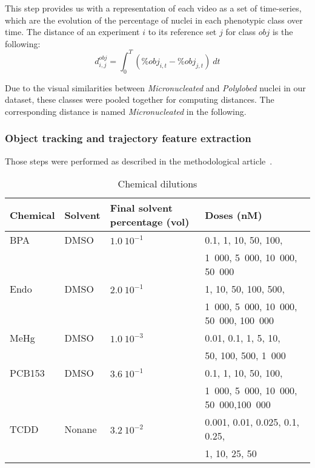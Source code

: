 This step provides us with a representation of each video as a set of time-series, which are the evolution of the percentage of nuclei in each phenotypic class over time. The distance of an experiment $i$ to its reference set $j$ for class $obj$ is the following:
\[
d^{obj}_{i,j} = \int_0^{T} (\% obj_{i,t} - \% obj_{j,t} )~dt
\]

Due to the visual similarities between \textit{Micronucleated} and \textit{Polylobed} nuclei in our dataset, these classes were pooled together for computing distances. The corresponding distance is named \textit{Micronucleated} in the following.

\subsubsection{Object tracking and trajectory feature extraction} Those steps were performed as described in the methodological article~\cite{motiw}.


\begin{table}[!ht]
\caption{Chemical dilutions}
\vspace{0.4cm}
\label{dilutions}
\begin{tabular}{|l|l|l|l|}
\hline
Chemical & Solvent & \parbox{3cm}{Final solvent percentage (vol)} & Doses (nM) \\
\hline
BPA & DMSO & $1.0~10^{-1} $ &0.1, 1, 10, 50, 100, \\
&&&1~000, 5~000, 10~000, 50~000\\
\hline
Endo & DMSO & $2.0~10^{-1} $ &1, 10, 50, 100, 500,\\
&&& 1~000, 5~000, 10~000, 50~000, 100~000\\
\hline
MeHg & DMSO & $1.0~10^{-3} $ & 0.01, 0.1, 1, 5, 10,\\
&&& 50, 100, 500, 1~000\\
\hline
PCB153 & DMSO & $3.6~10^{-1} $ &0.1, 1, 10, 50, 100,\\
&&& 1~000, 5~000, 10~000, 50~000,100~000\\
\hline
TCDD & Nonane &$3.2~10^{-2} $ & 0.001, 0.01,	0.025, 0.1, 0.25,\\
&&& 1, 10, 25, 50\\
\hline
\end{tabular}
\end{table}
